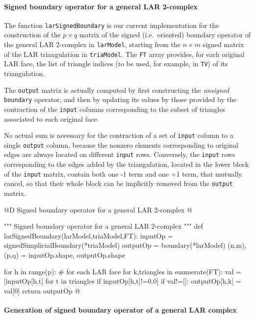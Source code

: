 \documentclass[11pt,oneside]{article}    %
\begin{document}
\paragraph{Signed boundary operator for a general LAR 2-complex}

The function \texttt{larSignedBoundary} is our current implementation for the construction of the $p\times q$ matrix of the signed (i.e.~oriented) boundary operator of the general LAR 2-complex in \texttt{larModel}, starting from the $n\times m$ signed matrix of the LAR triangulation in \texttt{triaModel}. The \texttt{FT} array provides, for each original LAR face, the list of triangle indices (to be used, for example, in \texttt{TV}) of its triangulation.

The \texttt{output} matrix is actually computed by  first constructing the \emph{unsigned} \texttt{boundary} operator, and then by updating its values by those provided by the contraction of the \texttt{input} columns corresponding to the subset of triangles associated to each original face.

No actual sum is necessary for the contraction of a set of \texttt{input} column to a single \texttt{output} column, because the nonzero elements corresponding to original edges are always located on different \texttt{input} rows.  Conversely, the \texttt{input} rows corresponding to the edges added by the triangulation, located in the lower block of the \texttt{input} matrix, contain both one -1 term and one +1 term, that mutually cancel, so that their whole block can be implicitly removed from the \texttt{output} matrix.

@D Signed boundary operator for a general LAR 2-complex
@{""" Signed boundary operator for a general LAR 2-complex """
def larSignedBoundary(larModel,triaModel,FT):
    inputOp = signedSimplicialBoundary(*triaModel)
    outputOp = boundary(*larModel)
    (n,m),(p,q) = inputOp.shape, outputOp.shape
    
    for h in range(p):   # for each LAR face
        for k,triangles in enumerate(FT):
            val = [inputOp[h,t] for t in triangles if inputOp[h,t]!=0.0]
            if val!=[]: outputOp[h,k] = val[0]
    return outputOp
@}



\paragraph{Generation of signed boundary operator of a general LAR complex}
\end{document}

